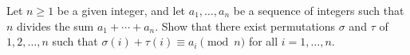 Let $n \geq 1$ be a given integer, and let $a_1, \ldots, a_n$ be a sequence of integers such that $n$ divides the sum $a_1 + \cdots + a_n$. Show that there exist permutations $\sigma$ and $\tau$ of $1, 2, \ldots, n$ such that $\sigma(i) + \tau(i) \equiv a_i \pmod{n}$ for all $i = 1, \ldots, n$.
